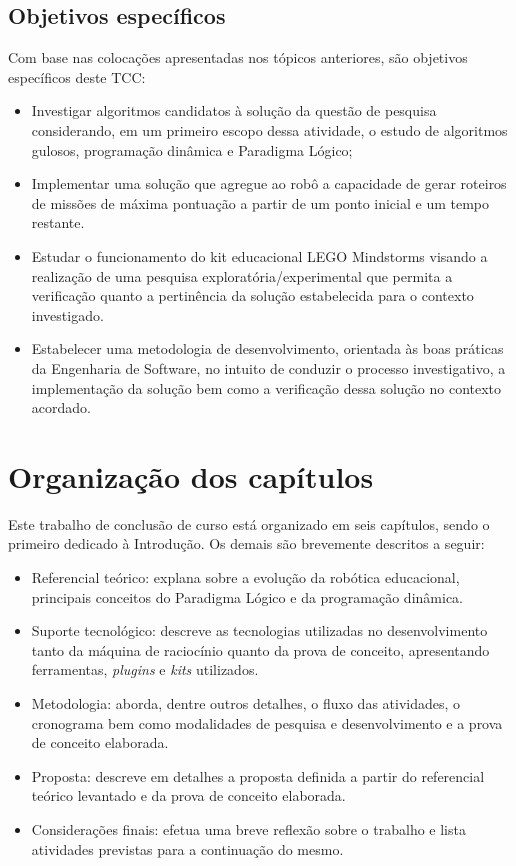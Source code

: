 \subsection{Objetivos específicos}
Com base nas colocações apresentadas nos tópicos anteriores, são objetivos específicos deste TCC:
\begin{itemize}
\item Investigar algoritmos candidatos à solução da questão de pesquisa considerando, em um primeiro escopo dessa atividade, o estudo de algoritmos gulosos, programação dinâmica e Paradigma Lógico;
\item Implementar uma solução que agregue ao robô a capacidade de gerar roteiros de missões de máxima pontuação a partir de um ponto inicial e um tempo restante.
\item Estudar o funcionamento do kit educacional LEGO Mindstorms visando a realização de uma pesquisa exploratória/experimental que permita a verificação quanto a pertinência da solução estabelecida para o contexto investigado.
\item Estabelecer uma metodologia de desenvolvimento, orientada às boas práticas da Engenharia de Software, no intuito de conduzir o processo investigativo, a implementação da solução bem como a verificação dessa solução no contexto acordado.
\end{itemize}

\section{Organização dos capítulos}
Este trabalho de conclusão de curso está organizado em seis capítulos, sendo o primeiro dedicado à Introdução. Os demais são brevemente descritos a seguir:
\begin{itemize}
\item Referencial teórico: explana sobre a evolução da robótica educacional, principais conceitos do Paradigma Lógico e da programação dinâmica. 
\item Suporte tecnológico: descreve as tecnologias utilizadas no desenvolvimento
tanto da máquina de raciocínio quanto da prova de conceito, apresentando ferramentas, \textit{plugins} e \textit{kits} utilizados.
\item Metodologia: aborda, dentre outros detalhes, o fluxo das atividades, o cronograma bem como modalidades de pesquisa e desenvolvimento e a prova de conceito elaborada.
\item Proposta: descreve em detalhes a proposta definida a partir do referencial teórico levantado e da prova de conceito elaborada.
\item Considerações finais: efetua uma breve reflexão sobre o trabalho e lista atividades previstas para a continuação do mesmo.
\end{itemize}


